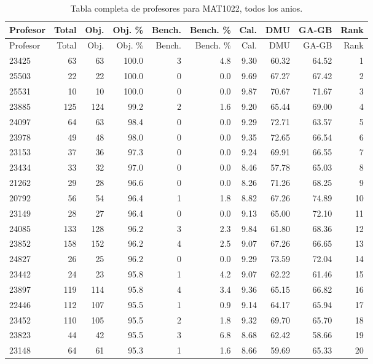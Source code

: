 \begingroup
\scriptsize
\setlength{\tabcolsep}{3pt}
\begin{longtable}{lrrrrrrrrr}
\caption{Tabla completa de profesores para MAT1022, todos los anios.}\label{tab:prof-global-mat1022-especializado}\\
\toprule
Profesor & Total & Obj. & Obj. \% & Bench. & Bench. \% & Cal. & DMU & GA-GB & Rank \\
\midrule
\endfirsthead
\toprule
Profesor & Total & Obj. & Obj. \% & Bench. & Bench. \% & Cal. & DMU & GA-GB & Rank \\
\midrule
\endhead
23425 & 63 & 63 & 100.0 & 3 & 4.8 & 9.30 & 60.32 & 64.52 & 1 \\
25503 & 22 & 22 & 100.0 & 0 & 0.0 & 9.69 & 67.27 & 67.42 & 2 \\
25531 & 10 & 10 & 100.0 & 0 & 0.0 & 9.87 & 70.67 & 71.67 & 3 \\
23885 & 125 & 124 & 99.2 & 2 & 1.6 & 9.20 & 65.44 & 69.00 & 4 \\
24097 & 64 & 63 & 98.4 & 0 & 0.0 & 9.29 & 72.71 & 63.57 & 5 \\
23978 & 49 & 48 & 98.0 & 0 & 0.0 & 9.35 & 72.65 & 66.54 & 6 \\
23153 & 37 & 36 & 97.3 & 0 & 0.0 & 9.24 & 69.91 & 66.55 & 7 \\
23434 & 33 & 32 & 97.0 & 0 & 0.0 & 8.46 & 57.78 & 65.03 & 8 \\
21262 & 29 & 28 & 96.6 & 0 & 0.0 & 8.26 & 71.26 & 68.25 & 9 \\
20792 & 56 & 54 & 96.4 & 1 & 1.8 & 8.82 & 67.26 & 74.89 & 10 \\
23149 & 28 & 27 & 96.4 & 0 & 0.0 & 9.13 & 65.00 & 72.10 & 11 \\
24085 & 133 & 128 & 96.2 & 3 & 2.3 & 9.84 & 61.80 & 68.36 & 12 \\
23852 & 158 & 152 & 96.2 & 4 & 2.5 & 9.07 & 67.26 & 66.65 & 13 \\
24827 & 26 & 25 & 96.2 & 0 & 0.0 & 9.29 & 73.59 & 72.04 & 14 \\
23442 & 24 & 23 & 95.8 & 1 & 4.2 & 9.07 & 62.22 & 61.46 & 15 \\
23897 & 119 & 114 & 95.8 & 4 & 3.4 & 9.36 & 65.15 & 66.82 & 16 \\
22446 & 112 & 107 & 95.5 & 1 & 0.9 & 9.14 & 64.17 & 65.94 & 17 \\
23452 & 110 & 105 & 95.5 & 2 & 1.8 & 9.32 & 69.70 & 65.70 & 18 \\
23823 & 44 & 42 & 95.5 & 3 & 6.8 & 8.68 & 62.42 & 58.66 & 19 \\
23148 & 64 & 61 & 95.3 & 1 & 1.6 & 8.66 & 59.69 & 65.33 & 20 \\

\end{longtable}
